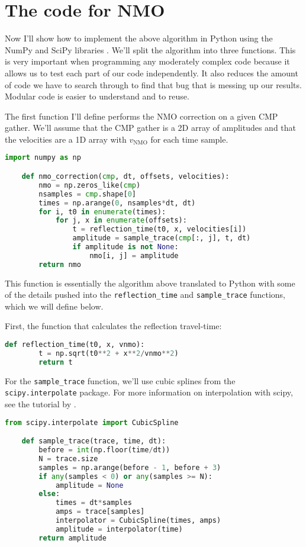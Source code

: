 \section{The code for NMO}

Now I'll show how to implement the above algorithm in Python using the NumPy and SciPy libraries \citep{van_der_Walt_2011}.
We'll split the algorithm into three functions.
This is very important when programming any moderately complex code because it allows us to test each part of our code independently.
It also reduces the amount of code we have to search through to find that bug that is messing up our results.
Modular code is easier to understand and to reuse.

The first function I'll define performs the NMO correction on a given CMP gather.
We'll assume that the CMP gather is a 2D array of amplitudes and that the
velocities are a 1D array with $v_\mathrm{NMO}$ for each time sample.

\begin{lstlisting}[language=python]
    import numpy as np

    def nmo_correction(cmp, dt, offsets, velocities):
        nmo = np.zeros_like(cmp)
        nsamples = cmp.shape[0]
        times = np.arange(0, nsamples*dt, dt)
        for i, t0 in enumerate(times):
            for j, x in enumerate(offsets):
                t = reflection_time(t0, x, velocities[i])
                amplitude = sample_trace(cmp[:, j], t, dt)
                if amplitude is not None:
                    nmo[i, j] = amplitude
        return nmo
\end{lstlisting}

This function is essentially the algorithm above translated to Python with some
of the details pushed into the \texttt{reflection\_time} and
\texttt{sample\_trace} functions, which we will define below.

First, the function that calculates the reflection travel-time:

\begin{lstlisting}[language=python]
    def reflection_time(t0, x, vnmo):
        t = np.sqrt(t0**2 + x**2/vnmo**2)
        return t
\end{lstlisting}

For the \texttt{sample\_trace} function, we'll use cubic splines from the
\texttt{scipy.interpolate} package.
For more information on interpolation with scipy, see the tutorial by
\citet{Hall_2016}.

\begin{lstlisting}[language=python]
    from scipy.interpolate import CubicSpline

    def sample_trace(trace, time, dt):
        before = int(np.floor(time/dt))
        N = trace.size
        samples = np.arange(before - 1, before + 3)
        if any(samples < 0) or any(samples >= N):
            amplitude = None
        else:
            times = dt*samples
            amps = trace[samples]
            interpolator = CubicSpline(times, amps)
            amplitude = interpolator(time)
        return amplitude
\end{lstlisting}

